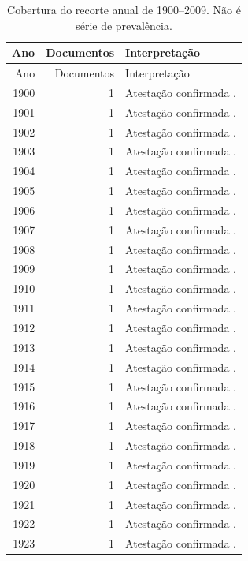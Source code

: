 \small\begin{longtable}{rrp{}}
\caption{Cobertura do recorte anual de 1900--2009. Não é série de prevalência.}\\
\toprule Ano & Documentos & Interpretação \\\midrule\endfirsthead
\toprule Ano & Documentos & Interpretação \\\midrule\endhead
1900 & 1 & Atestação confirmada \cite{anual1900}. \\
1901 & 1 & Atestação confirmada \cite{queiros1901}. \\
1902 & 1 & Atestação confirmada \cite{anual1902}. \\
1903 & 1 & Atestação confirmada \cite{anual1903}. \\
1904 & 1 & Atestação confirmada \cite{anual1904}. \\
1905 & 1 & Atestação confirmada \cite{anual1905}. \\
1906 & 1 & Atestação confirmada \cite{anual1906}. \\
1907 & 1 & Atestação confirmada \cite{anual1907}. \\
1908 & 1 & Atestação confirmada \cite{anual1908}. \\
1909 & 1 & Atestação confirmada \cite{anual1909}. \\
1910 & 1 & Atestação confirmada \cite{anual1910}. \\
1911 & 1 & Atestação confirmada \cite{anual1911}. \\
1912 & 1 & Atestação confirmada \cite{anual1912}. \\
1913 & 1 & Atestação confirmada \cite{anual1913}. \\
1914 & 1 & Atestação confirmada \cite{anual1914}. \\
1915 & 1 & Atestação confirmada \cite{anual1915}. \\
1916 & 1 & Atestação confirmada \cite{anual1916}. \\
1917 & 1 & Atestação confirmada \cite{almada1917}. \\
1918 & 1 & Atestação confirmada \cite{anual1918}. \\
1919 & 1 & Atestação confirmada \cite{lobato1919}. \\
1920 & 1 & Atestação confirmada \cite{anual1920}. \\
1921 & 1 & Atestação confirmada \cite{anual1921}. \\
1922 & 1 & Atestação confirmada \cite{anual1922}. \\
1923 & 1 & Atestação confirmada \cite{anual1923}. \\

\end{longtable}
